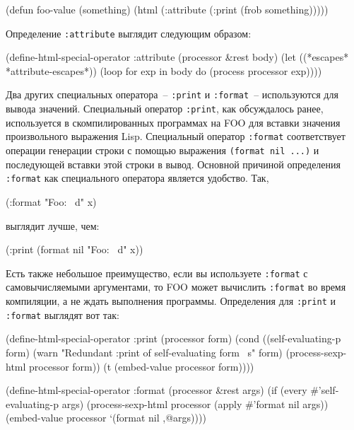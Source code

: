 \begin{myverb}
(defun foo-value (something)
  (html (:attribute (:print (frob something)))))
\end{myverb}

Определение \lstinline{:attribute} выглядит следующим образом:

\begin{myverb}
(define-html-special-operator :attribute (processor &rest body)
  (let ((*escapes* *attribute-escapes*))
    (loop for exp in body do (process processor exp))))
\end{myverb}

Два других специальных оператора~-- \lstinline{:print} и \lstinline{:format}~-- используются для
вывода значений.  Специальный оператор \lstinline{:print}, как обсуждалось ранее, используется
в скомпилированных программах на FOO для вставки значения произвольного выражения Lisp.
Специальный оператор \lstinline{:format} соответствует операции генерации строки с по\-мощью
выражения \lstinline{(format nil ...)} и последующей вставки этой строки в вывод.  Основной
причиной определения \lstinline{:format} как специального оператора является удобство.  Так,

\begin{myverb}
(:format "Foo: ~d" x)
\end{myverb}

\noindent{}выглядит лучше, чем:

\begin{myverb}
(:print (format nil "Foo: ~d" x))
\end{myverb}

Есть также небольшое преимущество, если вы используете \lstinline{:format} с самовычисляемыми
аргументами, то FOO может вычислить \lstinline{:format} во время
компиляции, а не ждать выполнения программы.  Определения для \lstinline{:print} и
\lstinline{:format} выглядят вот так:

\begin{myverb}
(define-html-special-operator :print (processor form)
  (cond
    ((self-evaluating-p form)
     (warn "Redundant :print of self-evaluating form ~s" form)
     (process-sexp-html processor form))
    (t
     (embed-value processor form))))

(define-html-special-operator :format (processor &rest args)
  (if (every #'self-evaluating-p args)
    (process-sexp-html processor (apply #'format nil args))
    (embed-value processor `(format nil ,@args))))
\end{myverb}

